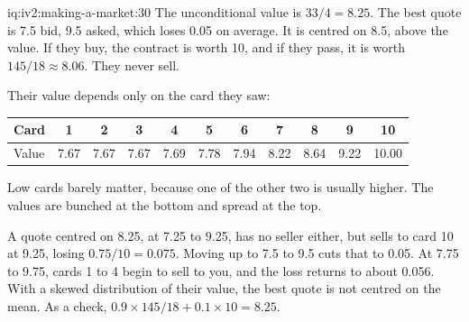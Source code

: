 \begin{solution}{iq:iv2:making-a-market:30}
The unconditional value is $33/4 = 8.25$. The best quote is 7.5 bid, 9.5 asked, which loses 0.05 on average. It is centred on 8.5, above the value. If they buy, the contract is worth 10, and if they pass, it is worth $145/18 \approx 8.06$. They never sell.

Their value depends only on the card they saw:
\begin{center}\small
\begin{tabular}{@{}l*{10}{c}@{}}
Card & 1 & 2 & 3 & 4 & 5 & 6 & 7 & 8 & 9 & 10 \\ \hline
Value & 7.67 & 7.67 & 7.67 & 7.69 & 7.78 & 7.94 & 8.22 & 8.64 & 9.22 & 10.00
\end{tabular}
\end{center}
Low cards barely matter, because one of the other two is usually higher. The values are bunched at the bottom and spread at the top.

A quote centred on 8.25, at 7.25 to 9.25, has no seller either, but sells to card 10 at 9.25, losing $0.75/10 = 0.075$. Moving up to 7.5 to 9.5 cuts that to 0.05. At 7.75 to 9.75, cards 1 to 4 begin to sell to you, and the loss returns to about 0.056. With a skewed distribution of their value, the best quote is not centred on the mean. As a check, $0.9 \times 145/18 + 0.1 \times 10 = 8.25$.

\end{solution}

